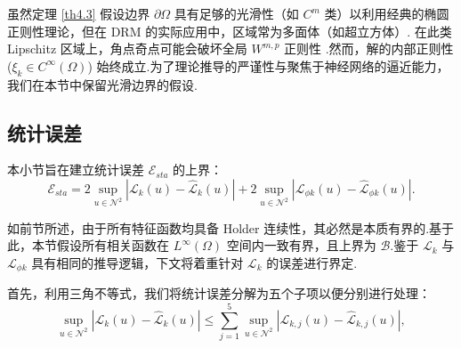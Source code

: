 \begin{remark}[关于多面体区域的正则性]
虽然定理 \ref{th4.3} 假设边界 $\partial \Omega$ 具有足够的光滑性（如 $C^m$ 类）以利用经典的椭圆正则性理论，但在 DRM 的实际应用中，区域常为多面体（如超立方体）.
在此类 Lipschitz 区域上，角点奇点可能会破坏全局 $W^{m,p}$ 正则性 \cite{grisvard2011elliptic}.然而，解的内部正则性 ($\xi_k \in C^\infty(\Omega)$) 始终成立.为了理论推导的严谨性与聚焦于神经网络的逼近能力，我们在本节中保留光滑边界的假设.
\end{remark}


\subsection{统计误差}\label{subsec_gen}
本小节旨在建立统计误差 $\mathcal{E}_{sta}$ 的上界：
\begin{equation*}
\mathcal{E}_{sta}=2 \sup _{u \in \mathcal{N}^{2}}\left|\mathcal{L}_{k}(u)-\widehat{\mathcal{L}}_{k}(u)\right|+2 \sup _{u \in \mathcal{N}^{2}}\left|\mathcal{L}_{\phi k}(u)-\widehat{\mathcal{L}}_{\phi k}(u)\right|.
\end{equation*}

如前节所述，由于所有特征函数均具备 Holder 连续性，其必然是本质有界的.基于此，本节假设所有相关函数在 $L^{\infty}(\Omega)$ 空间内一致有界，且上界为 $\mathcal{B}$.鉴于 $\mathcal{L}_{k}$ 与 $\mathcal{L}_{\phi k}$ 具有相同的推导逻辑，下文将着重针对 $\mathcal{L}_{k}$ 的误差进行界定.

首先，利用三角不等式，我们将统计误差分解为五个子项以便分别进行处理：
\begin{equation}\label{lemma:staerr:dec}
\sup _{u \in \mathcal{N}^2}\left|\mathcal{L}_{k}(u)-\widehat{\mathcal{L}}_{k}(u)\right|\leq\sum_{j=1}^{5}\sup _{u \in \mathcal{N}^2}\left|\mathcal{L}_{k,j}(u)-\widehat{\mathcal{L}}_{k,j}(u)\right|,
\end{equation}

